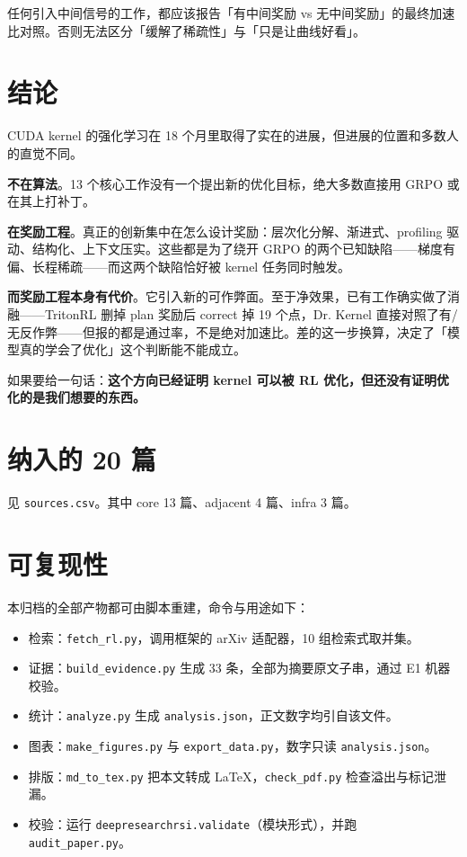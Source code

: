 任何引入中间信号的工作，都应该报告「有中间奖励 vs 无中间奖励」的最终加速比对照。否则无法区分「缓解了稀疏性」与「只是让曲线好看」。

\section{结论}

CUDA kernel 的强化学习在 18 个月里取得了实在的进展，但进展的位置和多数人的直觉不同。

\textbf{不在算法}。13 个核心工作没有一个提出新的优化目标，绝大多数直接用 GRPO 或在其上打补丁。

\textbf{在奖励工程}。真正的创新集中在怎么设计奖励：层次化分解、渐进式、profiling 驱动、结构化、上下文压实。这些都是为了绕开 GRPO 的两个已知缺陷——梯度有偏、长程稀疏——而这两个缺陷恰好被 kernel 任务同时触发。

\textbf{而奖励工程本身有代价}。它引入新的可作弊面。至于净效果，已有工作确实做了消融——TritonRL 删掉 plan 奖励后 correct 掉 19 个点，Dr. Kernel 直接对照了有/无反作弊——但报的都是通过率，不是绝对加速比。差的这一步换算，决定了「模型真的学会了优化」这个判断能不能成立。

如果要给一句话：\textbf{这个方向已经证明 kernel 可以被 RL 优化，但还没有证明优化的是我们想要的东西。}

\appendix
\section{纳入的 20 篇}

见 \texttt{sources.csv}。其中 core 13 篇、adjacent 4 篇、infra 3 篇。

\section{可复现性}

本归档的全部产物都可由脚本重建，命令与用途如下：

\begin{itemize}
\item 检索：\texttt{fetch\_rl.py}，调用框架的 arXiv 适配器，10 组检索式取并集。
\item 证据：\texttt{build\_evidence.py} 生成 33 条，全部为摘要原文子串，通过 E1 机器校验。
\item 统计：\texttt{analyze.py} 生成 \texttt{analysis.json}，正文数字均引自该文件。
\item 图表：\texttt{make\_figures.py} 与 \texttt{export\_data.py}，数字只读 \texttt{analysis.json}。
\item 排版：\texttt{md\_to\_tex.py} 把本文转成 LaTeX，\texttt{check\_pdf.py} 检查溢出与标记泄漏。
\item 校验：运行 \texttt{deepresearchrsi.validate}（模块形式），并跑 \texttt{audit\_paper.py}。
\end{itemize}

